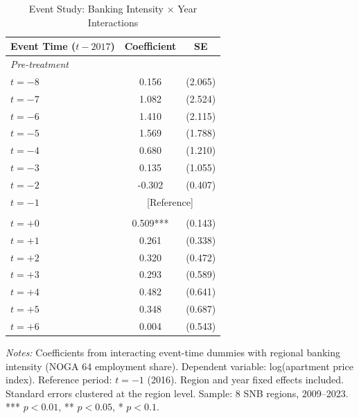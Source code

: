 \begin{table}[t]
\centering
\caption{Event Study: Banking Intensity $\times$ Year Interactions}
\label{tab:eventstudy}
\begin{threeparttable}
\begin{tabular}{lcc}
\toprule
Event Time ($t - 2017$) & Coefficient & SE \\
\midrule
\multicolumn{3}{l}{\textit{Pre-treatment}} \\
$t = -8$ & 0.156 & (2.065) \\
$t = -7$ & 1.082 & (2.524) \\
$t = -6$ & 1.410 & (2.115) \\
$t = -5$ & 1.569 & (1.788) \\
$t = -4$ & 0.680 & (1.210) \\
$t = -3$ & 0.135 & (1.055) \\
$t = -2$ & -0.302 & (0.407) \\
$t = -1$ & \multicolumn{2}{c}{[Reference]} \\
\addlinespace
\multicolumn{3}{l}{\textit{Post-treatment}} \\
$t = +0$ & 0.509*** & (0.143) \\
$t = +1$ & 0.261 & (0.338) \\
$t = +2$ & 0.320 & (0.472) \\
$t = +3$ & 0.293 & (0.589) \\
$t = +4$ & 0.482 & (0.641) \\
$t = +5$ & 0.348 & (0.687) \\
$t = +6$ & 0.004 & (0.543) \\
\bottomrule
\end{tabular}
\begin{tablenotes}[flushleft]\footnotesize
\item \textit{Notes:} Coefficients from interacting event-time dummies with regional banking intensity (NOGA 64 employment share). Dependent variable: log(apartment price index). Reference period: $t = -1$ (2016). Region and year fixed effects included. Standard errors clustered at the region level. Sample: 8 SNB regions, 2009--2023. *** $p < 0.01$, ** $p < 0.05$, * $p < 0.1$.
\end{tablenotes}
\end{threeparttable}
\end{table}
